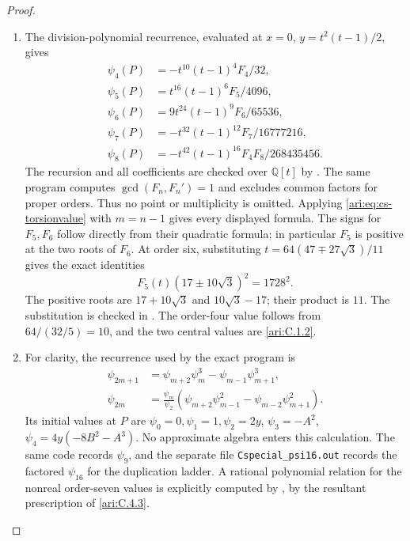 \begin{proof}
\begin{enumerate}[label=\arabic*.,leftmargin=*]
\item The division-polynomial recurrence, evaluated at $x=0$,
$y=t^2(t-1)/2$, gives
\[
 \begin{aligned}
 \psi_4(P)&=-t^{10}(t-1)^4F_4/32,\\
 \psi_5(P)&=t^{16}(t-1)^6F_5/4096,\\
 \psi_6(P)&=9t^{24}(t-1)^9F_6/65536,\\
 \psi_7(P)&=-t^{32}(t-1)^{12}F_7/16777216,\\
 \psi_8(P)&=-t^{42}(t-1)^{16}F_4F_8/268435456.
 \end{aligned}
\]
The recursion and all coefficients are checked over $\mathbb Q[t]$
by . The same program computes
$\gcd(F_n,F_n')=1$ and excludes common factors for proper orders.
Thus no point or multiplicity is omitted. Applying
\eqref{ari:eq:cs-torsionvalue} with $m=n-1$ gives every displayed
formula. The signs for $F_5,F_6$ follow directly from their quadratic
formula; in particular $F_5$ is positive at the two roots of $F_6$.
At order six, substituting
$t=64(47\mp27\sqrt3)/11$ gives the exact identities
\[
 F_5(t)(17\pm10\sqrt3)^2=1728^2.
\]
The positive roots are $17+10\sqrt3$ and $10\sqrt3-17$; their
product is $11$. The substitution is checked in
. The order-four value follows from
$64/(32/5)=10$, and the two central values are \ref{ari:C.1.2}.

\item For clarity, the recurrence used by the exact program is
\[
 \begin{aligned}
 \psi_{2m+1}&=\psi_{m+2}\psi_m^3-\psi_{m-1}\psi_{m+1}^3,\\
 \psi_{2m}&=\frac{\psi_m}{\psi_2}
   (\psi_{m+2}\psi_{m-1}^2-\psi_{m-2}\psi_{m+1}^2).
 \end{aligned}
\]
Its initial values at $P$ are $\psi_0=0,\psi_1=1,\psi_2=2y$,
$\psi_3=-A^2$, $\psi_4=4y(-8B^2-A^3)$. No approximate algebra
enters this calculation. The same code records $\psi_9$, and the
separate file \texttt{Cspecial\_psi16.out} records the factored
$\psi_{16}$ for the duplication ladder. A rational polynomial
relation for the nonreal order-seven values is explicitly computed
by , by the resultant prescription
of \ref{ari:C.4.3}.
\end{enumerate}
\end{proof}

